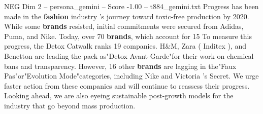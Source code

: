 \begin{textsample}{NEG Dim 2 – persona\_gemini – Score -1.00 – t884\_gemini.txt}  \label{ex:f2_neg_003}
Progress has been made in the \textbf{fashion} industry 's journey toward toxic-free production by 2020.
While some \textbf{brands} resisted, initial commitments were secured from Adidas, Puma, and Nike.
Today, over 70 \textbf{brands}, which account for 15 %
To measure this progress, the Detox Catwalk ranks 19 companies.
H\&M, Zara ( Inditex ), and Benetton are leading the pack as"Detox Avant-Garde"for their work on chemical bans and transparency.
However, 16 other \textbf{brands} are lagging in the"Faux Pas"or"Evolution Mode"categories, including Nike and Victoria ’s Secret.
We urge faster action from these companies and will continue to reassess their progress.
Looking ahead, we are also eyeing sustainable post-growth models for the industry that go beyond mass production.

\end{textsample}
